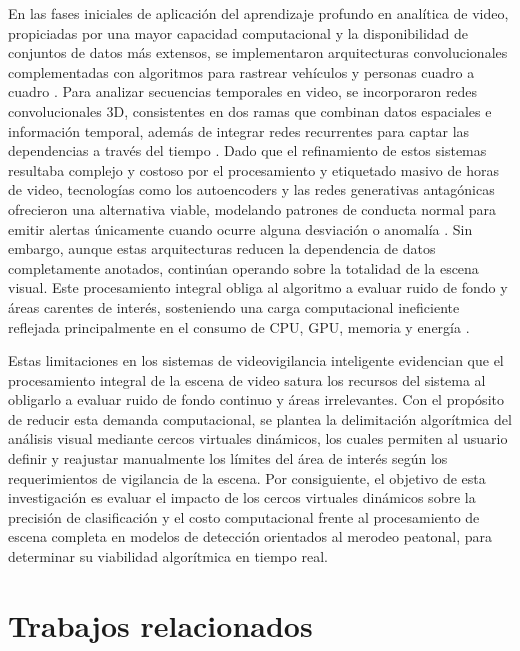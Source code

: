 \documentclass[runningheads]{llncs}
\begin{document}
En las fases iniciales de aplicación del aprendizaje profundo en analítica de video, propiciadas por una mayor capacidad computacional y la disponibilidad de conjuntos de datos más extensos, se implementaron arquitecturas convolucionales complementadas con algoritmos para rastrear vehículos y personas cuadro a cuadro \cite{vinod2024,nayak2019}. Para analizar secuencias temporales en video, se incorporaron redes convolucionales 3D, consistentes en dos ramas que combinan datos espaciales e información temporal, además de integrar redes recurrentes para captar las dependencias a través del tiempo \cite{mehmood2021,choudhry2023}. Dado que el refinamiento de estos sistemas resultaba complejo y costoso por el procesamiento y etiquetado masivo de horas de video, tecnologías como los autoencoders y las redes generativas antagónicas ofrecieron una alternativa viable, modelando patrones de conducta normal para emitir alertas únicamente cuando ocurre alguna desviación o anomalía \cite{choudhry2023,cho2025}. Sin embargo, aunque estas arquitecturas reducen la dependencia de datos completamente anotados, continúan operando sobre la totalidad de la escena visual. Este procesamiento integral obliga al algoritmo a evaluar ruido de fondo y áreas carentes de interés, sosteniendo una carga computacional ineficiente reflejada principalmente en el consumo de CPU, GPU, memoria y energía \cite{vinod2024}.

Estas limitaciones en los sistemas de videovigilancia inteligente evidencian que el procesamiento integral de la escena de video satura los recursos del sistema al obligarlo a evaluar ruido de fondo continuo y áreas irrelevantes. Con el propósito de reducir esta demanda computacional, se plantea la delimitación algorítmica del análisis visual mediante cercos virtuales dinámicos, los cuales permiten al usuario definir y reajustar manualmente los límites del área de interés según los requerimientos de vigilancia de la escena. Por consiguiente, el objetivo de esta investigación es evaluar el impacto de los cercos virtuales dinámicos sobre la precisión de clasificación y el costo computacional frente al procesamiento de escena completa en modelos de detección orientados al merodeo peatonal, para determinar su viabilidad algorítmica en tiempo real.



%
%
%
\section{Trabajos relacionados}
\end{document}
